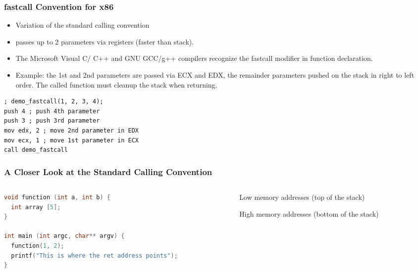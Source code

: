 \documentclass[]{beamer}
\begin{document}
\begin{frame}[fragile]
  \frametitle{fastcall Convention for x86}
  \begin{itemize}
  \item{Variation of the standard calling convention}
  \item {passes up to 2 parameters via registers (faster than stack).}
  \item{The Microsoft Visual C/ C++ and GNU GCC/g++ compilers recognize the \color{red}fastcall\color{black} modifier in function declaration.}
  \item{Example: the 1st and 2nd parameters are passed via ECX and EDX, the remainder parameters pushed on the stack in right to left order. The called function must cleanup the stack when returning.}
  \end{itemize}
\begin{lstlisting}[language={[x86masm]Assembler}]
; demo_fastcall(1, 2, 3, 4);
push 4 ; push 4th parameter
push 3 ; push 3rd parameter
mov edx, 2 ; move 2nd parameter in EDX
mov ecx, 1 ; move 1st parameter in ECX
call demo_fastcall
\end{lstlisting}
\end{frame}

\begin{frame}[fragile]
  \frametitle{A Closer Look at the Standard Calling Convention}
  \begin{columns}
    \begin{column}{.5\textwidth}
\begin{lstlisting}[language=C]
void function (int a, int b) {
  int array [5];
}

int main (int argc, char** argv) {
  function(1, 2);
  printf("This is where the ret address points");
}
\end{lstlisting}
    \end{column}
    \begin{column}{.5\textwidth}
      \begin{center}
        {\tiny Low memory addresses (top of the stack)}
        \begin{center}
        \end{center}
        {\tiny High memory addresses (bottom of the stack)}
      \end{center}

    \end{column}
  \end{columns}
\end{frame}
\end{document}
